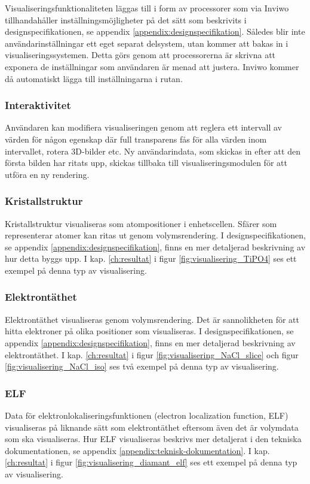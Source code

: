 \documentclass[a4paper,12pt,twoside,openright]{report}
\begin{document}
Visualiseringsfunktionaliteten läggas till i form av processorer som via Inviwo tillhandahåller inställningsmöjligheter på det sätt som beskrivits i designspecifikationen, se appendix \ref{appendix:designspecifikation}. Således blir inte användarinställningar ett eget separat delsystem, utan kommer att bakas in i visualiseringssystemen. Detta görs genom att processorerna är skrivna att exponera de inställningar som användaren är menad att
justera. Inviwo kommer då automatiskt lägga till inställningarna i rutan.

\subsubsection{Interaktivitet}
Användaren kan modifiera visualiseringen genom att reglera ett intervall av värden för
någon egenskap där full transparens fås för alla värden inom intervallet, rotera 3D-bilder etc.
Ny användarindata, som skickas in efter att den första bilden har ritats upp, skickas tillbaka till
visualiseringsmodulen för att utföra en ny rendering. 

\subsubsection{Kristallstruktur}
Kristallstruktur visualiseras som atompositioner i enhetscellen. Sfärer som representerar atomer  kan  ritas  ut  genom  volymsrendering. %
I designspecifikationen, se appendix \ref{appendix:designspecifikation}, finns en mer detaljerad beskrivning av
hur detta byggs upp. I kap. \ref{ch:resultat} i figur \ref{fig:visualisering_TiPO4} ses ett exempel på denna typ av visualisering.


\subsubsection{Elektrontäthet}
Elektrontäthet visualiseras genom volymsrendering. Det är sannolikheten för att hitta elektroner på olika positioner som visualiseras.
I designspecifikationen, se appendix \ref{appendix:designspecifikation}, finns en mer detaljerad beskrivning av elektrontäthet. I kap. \ref{ch:resultat} i figur \ref{fig:visualisering_NaCl_slice} och figur \ref{fig:visualisering_NaCl_iso} ses två exempel på denna typ av visualisering.

\subsubsection{ELF}
Data för elektronlokaliseringsfunktionen (electron localization function, ELF) visualiseras på liknande sätt som elektrontäthet eftersom även det är volymdata som ska visualiseras. Hur ELF visualiseras beskrivs mer detaljerat i den tekniska dokumentationen, se appendix \ref{appendix:teknisk-dokumentation}. I kap. \ref{ch:resultat} i figur \ref{fig:visualisering_diamant_elf} ses ett exempel på denna typ av visualisering.
\end{document}
